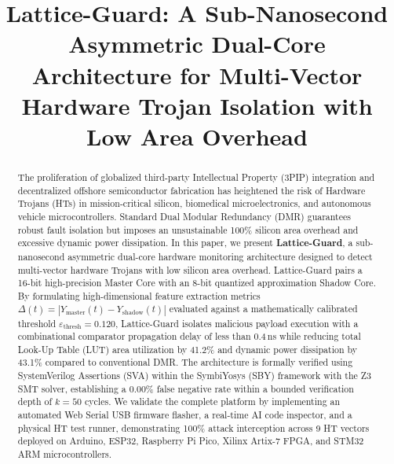 \documentclass[conference]{IEEEtran}
\begin{document}
\title{Lattice-Guard: A Sub-Nanosecond Asymmetric Dual-Core Architecture for Multi-Vector Hardware Trojan Isolation with Low Area Overhead}

\author{
}

\maketitle

\begin{abstract}
The proliferation of globalized third-party Intellectual Property (3PIP) integration and decentralized offshore semiconductor fabrication has heightened the risk of Hardware Trojans (HTs) in mission-critical silicon, biomedical microelectronics, and autonomous vehicle microcontrollers. Standard Dual Modular Redundancy (DMR) guarantees robust fault isolation but imposes an unsustainable 100\% silicon area overhead and excessive dynamic power dissipation. In this paper, we present \textbf{Lattice-Guard}, a sub-nanosecond asymmetric dual-core hardware monitoring architecture designed to detect multi-vector hardware Trojans with low silicon area overhead. Lattice-Guard pairs a 16-bit high-precision Master Core with an 8-bit quantized approximation Shadow Core. By formulating high-dimensional feature extraction metrics $\Delta(t) = |Y_{\text{master}}(t) - Y_{\text{shadow}}(t)|$ evaluated against a mathematically calibrated threshold $\varepsilon_{\text{thresh}} = 0.120$, Lattice-Guard isolates malicious payload execution with a combinational comparator propagation delay of less than 0.4\,ns while reducing total Look-Up Table (LUT) area utilization by 41.2\% and dynamic power dissipation by 43.1\% compared to conventional DMR. The architecture is formally verified using SystemVerilog Assertions (SVA) within the SymbiYosys (SBY) framework with the Z3 SMT solver, establishing a 0.00\% false negative rate within a bounded verification depth of $k=50$ cycles. We validate the complete platform by implementing an automated Web Serial USB firmware flasher, a real-time AI code inspector, and a physical HT test runner, demonstrating 100\% attack interception across 9 HT vectors deployed on Arduino, ESP32, Raspberry Pi Pico, Xilinx Artix-7 FPGA, and STM32 ARM microcontrollers.
\end{abstract}
\end{document}
